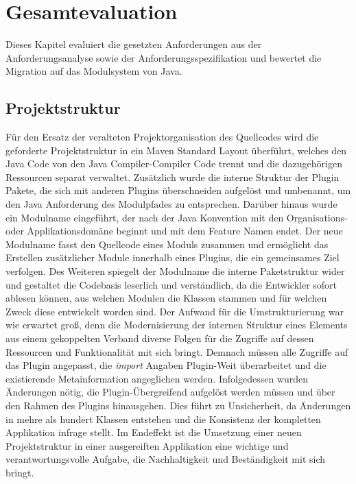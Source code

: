 \chapter{Gesamtevaluation}
Dieses Kapitel evaluiert die gesetzten Anforderungen aus der Anforderungsanalyse sowie der Anforderungsspezifikation und bewertet die Migration auf das Modulsystem von Java.\bigbreak	

\section{Projektstruktur}
Für den Ersatz der veralteten Projektorganisation des Quellcodes wird die geforderte Projektstruktur in ein Maven Standard Layout überführt, welches den Java Code von den Java Compiler-Compiler Code trennt und die dazugehörigen Ressourcen separat verwaltet. Zusätzlich wurde die interne Struktur der Plugin Pakete, die sich mit anderen Plugins überschneiden aufgelöst und umbenannt, um den Java Anforderung des Modulpfades zu entsprechen. Darüber hinaus wurde ein Modulname eingeführt, der nach der Java Konvention mit den Organisations- oder Applikationsdomäne beginnt und mit dem Feature Namen endet. Der neue Modulname fasst den Quellcode eines Moduls zusammen und ermöglicht das Erstellen zusätzlicher Module innerhalb eines Plugins, die ein gemeinsames Ziel verfolgen. Des Weiteren spiegelt der Modulname die interne Paketstruktur wider und gestaltet die Codebasis leserlich und verständlich, da die Entwickler sofort ablesen können, aus welchen Modulen die Klassen stammen und für welchen Zweck diese entwickelt worden sind.\newline
Der Aufwand für die Umstrukturierung war wie erwartet groß, denn die Modernisierung der internen Struktur eines Elements aus einem gekoppelten Verband diverse Folgen für die Zugriffe auf dessen Ressourcen und Funktionalität mit sich bringt. Demnach müssen alle Zugriffe auf das Plugin angepasst, die \textit{import} Angaben Plugin-Weit überarbeitet und die existierende Metainformation angeglichen werden. Infolgedessen wurden Änderungen nötig, die Plugin-Übergreifend aufgelöst werden müssen und über den Rahmen des Plugins hinausgehen. Dies führt zu Unsicherheit, da Änderungen in mehre als hundert Klassen entstehen und die Konsistenz der kompletten Applikation infrage stellt. \newline
Im Endeffekt ist die Umsetzung einer neuen Projektstruktur in einer ausgereiften Applikation eine wichtige und verantwortungsvolle Aufgabe, die  Nachhaltigkeit und Beständigkeit mit sich bringt.\bigbreak

